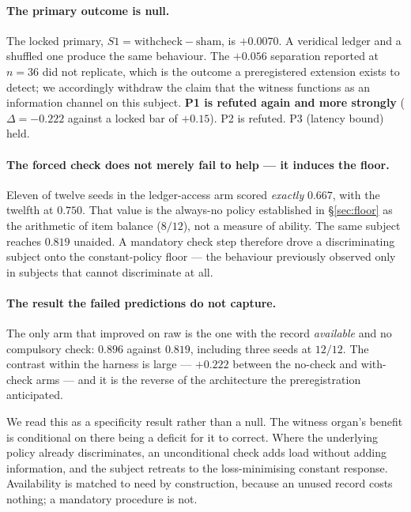 \paragraph{The primary outcome is null.} The locked primary,
$S1 = \text{withcheck} - \text{sham}$, is $+0.0070$. A veridical ledger and
a shuffled one produce the same behaviour. The $+0.056$ separation reported
at $n=36$ did not replicate, which is the outcome a preregistered extension
exists to detect; we accordingly withdraw the claim that the witness
functions as an information channel on this subject. \textbf{P1 is refuted
again and more strongly} ($\Delta = -0.222$ against a locked bar of
$+0.15$). P2 is refuted. P3 (latency bound) held.

\paragraph{The forced check does not merely fail to help --- it induces the
floor.} Eleven of twelve seeds in the ledger-access arm scored
\emph{exactly} $0.667$, with the twelfth at $0.750$. That value is the
always-no policy established in \S\ref{sec:floor} as the arithmetic of item
balance ($8/12$), not a measure of ability. The same subject reaches
$0.819$ unaided. A mandatory check step therefore drove a discriminating
subject onto the constant-policy floor --- the behaviour previously
observed only in subjects that cannot discriminate at all.

\paragraph{The result the failed predictions do not capture.} The only arm
that improved on raw is the one with the record \emph{available} and no
compulsory check: $0.896$ against $0.819$, including three seeds at
$12/12$. The contrast within the harness is large --- $+0.222$ between the
no-check and with-check arms --- and it is the reverse of the architecture
the preregistration anticipated.

We read this as a specificity result rather than a null. The witness
organ's benefit is conditional on there being a deficit for it to correct.
Where the underlying policy already discriminates, an unconditional check
adds load without adding information, and the subject retreats to the
loss-minimising constant response. Availability is matched to need by
construction, because an unused record costs nothing; a mandatory
procedure is not.

